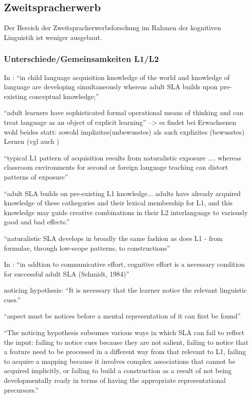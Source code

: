 \subsection{Zweitspracherwerb}
Der Bereich der Zweitspracherwerbsforschung im Rahmen der kognitiven Linguistik ist weniger ausgebaut.
\subsubsection{Unterschiede/Gemeinsamkeiten L1/L2}

        In \cite{Ellis08}: ``in child language acquisition knowledge of the world and knowledge of language are developing simultaneously whereas adult SLA builds upon pre-existing conceptual knowledge;''

        ``adult learners have sophisticated formal operational means of thinking and can treat language as an object of explicit learning''
        --> es findet bei Erwachsenen wohl beides statt: sowohl implizites(unbewusstes) als auch explizites (bewusstes) Lernen (vgl auch \cite{Ellis04})

        ``typical L1 pattern of acquisition results from naturalistic exposure .... whereas classroom environments for second or foreign language teaching can distort patterns of exposure''

        ``adult SLA builds on pre-existing L1 knowledge... adults have already acquired knowledge of these cathegories and their lexical membership for L1, and this knowledge may guide creative combinations in their L2 interlanguage to variously good and bad effects.''

        ``naturalistic SLA develops in broadly the same fashion as does L1 - from formulae, through low-scope patterns, to constructions''

        In \cite{Ellis04}: ``in addtion to communicative effort, cognitive effort is a necessary condition for successful adult SLA (Schmidt, 1984)''

        noticing hypothesis: ``It is necessary that the learner notice the relevant linguistic cues.''

        ``aspect must be notices before a mental representation of it can first be found''

        ``The noticing hypothesis subsumes various ways in which SLA can fail to reflect the input: failing to notice cues because they are not salient, failing to notice that a feature need to be processed in a different way from that relevant to L1, failing to acquire a mapping because it involves complex associations that cannot be acquired implicitly, or failing to build a construction as a result of not being developmentally ready in terms of having the appropriate representational precursors.''

